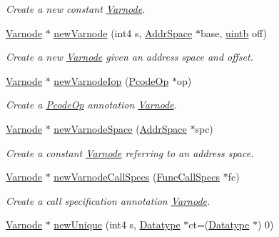 \begin{DoxyCompactItemize}
\begin{DoxyCompactList}\small\item\em Create a new {\itshape constant} \mbox{\hyperlink{class_varnode}{Varnode}}. \end{DoxyCompactList}\item 
\mbox{\hyperlink{class_varnode}{Varnode}} $\ast$ \mbox{\hyperlink{class_funcdata_a0d6888d1606fd8ed6372355995bc7887}{new\+Varnode}} (int4 s, \mbox{\hyperlink{class_addr_space}{Addr\+Space}} $\ast$base, \mbox{\hyperlink{types_8h_a2db313c5d32a12b01d26ac9b3bca178f}{uintb}} off)
\begin{DoxyCompactList}\small\item\em Create a new \mbox{\hyperlink{class_varnode}{Varnode}} given an address space and offset. \end{DoxyCompactList}\item 
\mbox{\hyperlink{class_varnode}{Varnode}} $\ast$ \mbox{\hyperlink{class_funcdata_a8ee39fe2d1f2f4702864e78dc06e6bb8}{new\+Varnode\+Iop}} (\mbox{\hyperlink{class_pcode_op}{Pcode\+Op}} $\ast$op)
\begin{DoxyCompactList}\small\item\em Create a \mbox{\hyperlink{class_pcode_op}{Pcode\+Op}} {\itshape annotation} \mbox{\hyperlink{class_varnode}{Varnode}}. \end{DoxyCompactList}\item 
\mbox{\hyperlink{class_varnode}{Varnode}} $\ast$ \mbox{\hyperlink{class_funcdata_acc9f6fb3e8a36e0e1e633660fc05fdbf}{new\+Varnode\+Space}} (\mbox{\hyperlink{class_addr_space}{Addr\+Space}} $\ast$spc)
\begin{DoxyCompactList}\small\item\em Create a constant \mbox{\hyperlink{class_varnode}{Varnode}} referring to an address space. \end{DoxyCompactList}\item 
\mbox{\hyperlink{class_varnode}{Varnode}} $\ast$ \mbox{\hyperlink{class_funcdata_a13da637294b7cae252ffc6c9e2116da2}{new\+Varnode\+Call\+Specs}} (\mbox{\hyperlink{class_func_call_specs}{Func\+Call\+Specs}} $\ast$fc)
\begin{DoxyCompactList}\small\item\em Create a call specification {\itshape annotation} \mbox{\hyperlink{class_varnode}{Varnode}}. \end{DoxyCompactList}\item 
\mbox{\hyperlink{class_varnode}{Varnode}} $\ast$ \mbox{\hyperlink{class_funcdata_a731f6fd415269577b7bb1943315b8a76}{new\+Unique}} (int4 s, \mbox{\hyperlink{class_datatype}{Datatype}} $\ast$ct=(\mbox{\hyperlink{class_datatype}{Datatype}} $\ast$) 0)

\end{DoxyCompactItemize}
